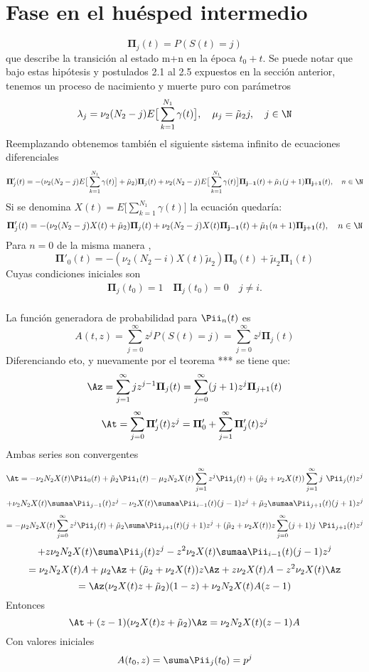 \section{Fase en el huésped intermedio}
$$\mathbf{\Pi}_j(t)=P(S(t)=j)$$
que describe la transición al estado m+n en la época $t_0+t$.
Se puede notar que bajo estas hipótesis y postulados 2.1 al 2.5 expuestos en la sección anterior, tenemos un proceso de nacimiento y muerte puro con parámetros $$\lambda_j=\nu_2(N_2-j)E\big[\sum_{k=1}^{N_1}\gamma(t)\big],\quad\mu_j=\tilde{\mu}_2 j,\quad j\in\N$$
Reemplazando obtenemos también el siguiente sistema infinito de ecuaciones diferenciales $$\mathbf{\Pi}'_j(t)=-(\nu_2(N_2-j)E\big[\sum_{k=1}^{N_1}\gamma(t)\big]+\tilde{\mu}_2)\mathbf{\Pi}_j(t)+\nu_2(N_2-j)E\big[\sum_{k=1}^{N_1}\gamma(t)\big]\mathbf{\Pi_{j-1}}(t)+\tilde{\mu}_1 (j+1)\mathbf{\Pi_{j+1}}(t),\quad n\in\N$$
Si se denomina $X(t)=E\big[\sum_{k=1}^{N_1}\gamma(t)\big]$ la ecuación quedaría:
$$\mathbf{\Pi}'_j(t)=-(\nu_2(N_2-j)X(t)+\tilde{\mu}_2)\mathbf{\Pi}_j(t)+\nu_2(N_2-j)X(t)\mathbf{\Pi_{j-1}}(t)+\tilde{\mu}_1 (n+1)\mathbf{\Pi_{j+1}}(t),\quad n\in\N$$
Para $n=0$ de la misma manera , $$\mathbf{\Pi}'_0(t)=-(\nu_2(N_2-i)X(t)\tilde{\mu}_2)\mathbf{\Pi}_0(t)+\tilde{\mu}_2 \mathbf{\Pi}_1(t)$$
Cuyas condiciones iniciales son
\begin{eqnarray}
\mathbf{\Pi}_j(t_0)=1\quad \mathbf{\Pi}_j(t_0)=0\quad j\not=i.
\end{eqnarray}
\\La función generadora de probabilidad para $ \Pii_n(t)$ es 
$$A(t,z)=\sum_{j=0}^\infty z^j P(S(t)=j)=\sum_{j=0}^\infty z^j \mathbf{\Pi}_j(t)$$
Diferenciando eto, y nuevamente por el teorema *** se tiene que: $$\Az=\sum_{j=1}^\infty jz^{j-1}\mathbf{\Pi}_j(t)=\sum_{j=0}^\infty (j+1)z^{j}\mathbf{\Pi}_{j+1}(t)$$ $$\At=\sum_{j=0}^\infty\mathbf{\Pi}'_j(t)z^j=\mathbf{\Pi}'_0+\sum_{j=1}^\infty \mathbf{\Pi}'_j(t)z^j$$
Ambas series son convergentes 
$$\At=-\nu_2N_2X(t)\Pii_0(t)+\tilde{\mu}_2\Pii_1(t)-\mu_2N_2X(t)\sum_{j=1}^\infty z^j\Pii_j(t)+(\tilde{\mu}_2+\nu_2X(t))\sum_{j=1}^{\infty}j\textbf{ }\Pii_j(t)z^j$$ 
$$+\nu_2N_2X(t)\sumaa\Pii_{j-1}(t)z^j-\nu_2X(t)\sumaa\Pii_{i-1}(t)(j-1)z^j+\tilde{\mu}_2\sumaa\Pii_{j+1}(t)(j+1)z^j $$
$$=-\mu_2N_2X(t)\sum_{j=0}^\infty z^j\Pii_j(t)+\tilde{\mu}_2\suma\Pii_{j+1}(t)(j+1)z^j+(\tilde{\mu}_2+\nu_2X(t))z\sum_{j=0}^{\infty}(j+1)j\textbf{ }\Pii_{j+1}(t)z^j$$ 
$$+z\nu_2N_2X(t)\suma\Pii_j(t)z^j-z^2\nu_2X(t)\sumaa\Pii_{i-1}(t)(j-1)z^j$$
$$=\nu_2N_2X(t)A+\mu_2\Az+(\tilde{\mu}_2+\nu_2X(t))z\Az+z\nu_2X(t)A-z^2\nu_2X(t)\Az$$
$$=\Az(\nu_2X(t)z+\tilde{\mu}_2)(1-z)+\nu_2N_2X(t)A(z-1)$$
Entonces 
$$\At+(z-1)(\nu_2X(t)z+\tilde{\mu}_2)\Az=\nu_2N_2X(t)(z-1)A$$
Con valores iniciales 
$$A(t_0,z)=\suma\Pii_j(t_0)=p^j$$